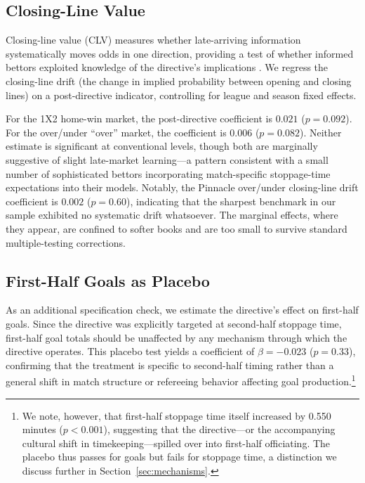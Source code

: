 \subsection{Closing-Line Value}\label{subsec:clv}

Closing-line value (CLV) measures whether late-arriving information
systematically moves odds in one direction, providing a test of whether
informed bettors exploited knowledge of the directive's implications
\citep{Kaunitz2017}. We regress the closing-line drift (the change in
implied probability between opening and closing lines) on a
post-directive indicator, controlling for league and season fixed effects.

For the 1X2 home-win market, the post-directive coefficient is $0.021$
($p = 0.092$). For the over/under ``over'' market, the coefficient is
$0.006$ ($p = 0.082$). Neither estimate is significant at conventional
levels, though both are marginally suggestive of slight late-market
learning---a pattern consistent with a small number of sophisticated
bettors incorporating match-specific stoppage-time expectations into
their models. Notably, the Pinnacle over/under closing-line drift
coefficient is $0.002$ ($p = 0.60$), indicating that the sharpest
benchmark in our sample exhibited no systematic drift whatsoever. The
marginal effects, where they appear, are confined to softer books and are
too small to survive standard multiple-testing corrections.

\subsection{First-Half Goals as Placebo}\label{subsec:placebo_betting}

As an additional specification check, we estimate the directive's effect
on first-half goals. Since the directive was explicitly targeted at
second-half stoppage time, first-half goal totals should be unaffected by
any mechanism through which the directive operates. This placebo test
yields a coefficient of $\beta = -0.023$ ($p = 0.33$), confirming that
the treatment is specific to second-half timing rather than a general
shift in match structure or refereeing behavior affecting goal
production.\footnote{We note, however, that first-half stoppage time
itself increased by 0.550 minutes ($p < 0.001$), suggesting that the
directive---or the accompanying cultural shift in timekeeping---spilled
over into first-half officiating. The placebo thus passes for goals but
fails for stoppage time, a distinction we discuss further in
Section~\ref{sec:mechanisms}.}

